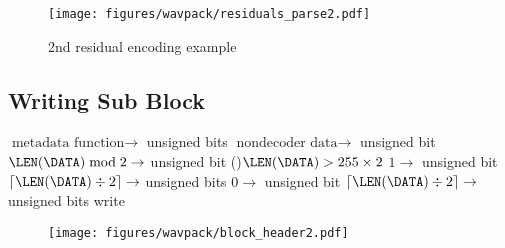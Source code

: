 \begin{figure}[h]
  \texttt{[image: figures/wavpack/residuals\_parse2.pdf]}
  \caption{2nd residual encoding example}
\end{figure}

\clearpage

\subsection{Writing Sub Block}
{
$\text{metadata function} \rightarrow$  unsigned bits\;
$\text{nondecoder data} \rightarrow$  unsigned bit\;
$\LEN(\text{\DATA}) \bmod 2 \rightarrow$  unsigned bit
\eIf(){$\LEN(\text{\DATA}) > 255 \times 2$}{
  $1 \rightarrow$  unsigned bit\;
  $\lceil\LEN(\text{\DATA}) \div 2\rceil \rightarrow$  unsigned bits\;
}{
  $0 \rightarrow$  unsigned bit\;
  $\lceil\LEN(\text{\DATA}) \div 2\rceil \rightarrow$  unsigned bits\;
}
write \DATA\;
\EALGORITHM
}

\begin{figure}[h]
\texttt{[image: figures/wavpack/block\_header2.pdf]}
\end{figure}

\clearpage

